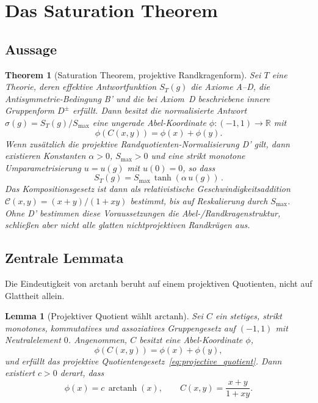 \documentclass[aps,prd,twocolumn,superscriptaddress,nofootinbib]{revtex4-2}
\newtheorem{theorem}{Theorem}
\newtheorem{lemma}{Lemma}
\begin{document}
\section{Das Saturation Theorem}
\label{sec:theorem}

\subsection{Aussage}

\begin{theorem}[Saturation Theorem, projektive Randkragenform]
\label{thm:saturation}
Sei $T$ eine Theorie, deren effektive Antwortfunktion $S_T(g)$ die Axiome A--D, die Antisymmetrie-Bedingung B' und die bei Axiom~D beschriebene innere Gruppenform $D^\pm$ erfüllt. Dann besitzt die normalisierte Antwort $\sigma(g)=S_T(g)/S_{\max}$ eine ungerade Abel-Koordinate $\phi:(-1,1)\to\mathbb{R}$ mit
\[
  \phi(C(x,y))=\phi(x)+\phi(y).
\]
Wenn zusätzlich die projektive Randquotienten-Normalisierung D' gilt, dann existieren Konstanten $\alpha > 0$, $S_{\max} > 0$ und eine strikt monotone Umparametrisierung $u = u(g)$ mit $u(0) = 0$, so dass
\begin{equation}
S_T(g) = S_{\max}\,\tanh\!\left(\alpha\,u(g)\right)\,.
\label{eq:saturation_form}
\end{equation}
Das Kompositionsgesetz ist dann als relativistische Geschwindigkeitsaddition $\mathcal{C}(x,y) = (x+y)/(1+xy)$ bestimmt, bis auf Reskalierung durch $S_{\max}$. Ohne D' bestimmen diese Voraussetzungen die Abel-/Randkragenstruktur, schließen aber nicht alle glatten nichtprojektiven Randkrägen aus.
\end{theorem}

\subsection{Zentrale Lemmata}

Die Eindeutigkeit von $\mathrm{arctanh}$ beruht auf einem projektiven Quotienten, nicht auf Glattheit allein.

\begin{lemma}[Projektiver Quotient wählt $\mathrm{arctanh}$]\label{lem:projective_arctanh}
Sei $C$ ein stetiges, strikt monotones, kommutatives und assoziatives Gruppengesetz auf $(-1,1)$ mit Neutralelement $0$. Angenommen, $C$ besitzt eine Abel-Koordinate $\phi$,
\[
  \phi(C(x,y))=\phi(x)+\phi(y),
\]
und erfüllt das projektive Quotientengesetz~\eqref{eq:projective_quotient}. Dann existiert $c>0$ derart, dass
\[
  \phi(x)=c\,\operatorname{arctanh}(x),
  \qquad
  C(x,y)=\frac{x+y}{1+xy}.
\]
\end{lemma}
\end{document}
